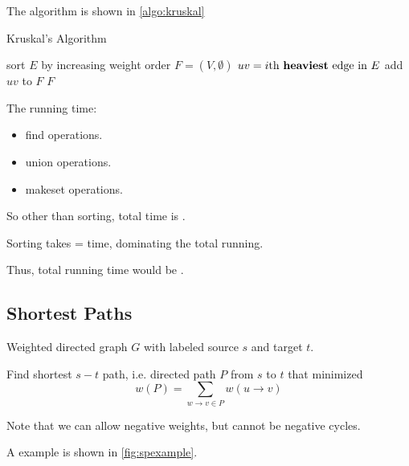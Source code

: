 The algorithm is shown in \cref{algo:kruskal}

\begin{algorithm}[H]
    \caption{Kruskal's Algorithm}\label{algo:kruskal}
    \begin{algorithmic}[1]
            \State sort $E$ by increasing weight order
            \State $F = (V, \emptyset)$
            \EndFor
            \State $uv = i\text{th \textbf{heaviest} edge in } E$
                    \State {}
                    \State add $uv$ to $F$
                \EndIf
            \EndFor
            \Return $F$
        \EndProcedure
    \end{algorithmic}
\end{algorithm}

\analysis

The running time:
\begin{itemize}
    \item {} find operations.
    \item {} union operations.
    \item {} makeset operations.
\end{itemize}
So other than sorting, total time is .

Sorting takes  =  time,
dominating the total running.

Thus, total running time would be .

\subsection{Shortest Paths}
\AlgoInput Weighted directed graph $G$ with labeled
source $s$ and target $t$.

\AlgoOutput Find shortest $s-t$ path, i.e. directed
path $P$ from $s$ to $t$ that minimized
\[w(P) = \sum_{w \rightarrow v \in P}w(u \rightarrow v)\]

Note that we can allow negative weights,
but cannot be negative cycles.

A example is shown in \cref{fig:spexample}.

